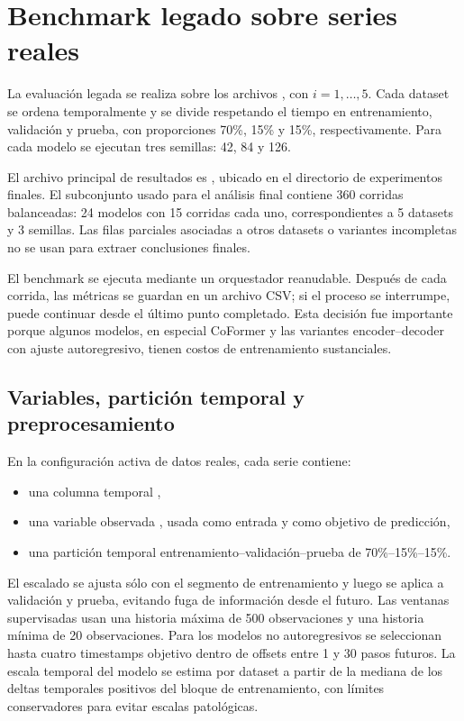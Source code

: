 \section{Benchmark legado sobre series reales}
\label{sec:escenario-real}

La evaluación legada se realiza sobre los archivos , con $i=1,\dots,5$. Cada dataset se ordena temporalmente y se divide respetando el tiempo en entrenamiento, validación y prueba, con proporciones 70\%, 15\% y 15\%, respectivamente. Para cada modelo se ejecutan tres semillas: 42, 84 y 126.

\hfill

El archivo principal de resultados es , ubicado en el directorio de experimentos finales. El subconjunto usado para el análisis final contiene 360 corridas balanceadas: 24 modelos con 15 corridas cada uno, correspondientes a 5 datasets y 3 semillas. Las filas parciales asociadas a otros datasets o variantes incompletas no se usan para extraer conclusiones finales.

\hfill

El benchmark se ejecuta mediante un orquestador reanudable. Después de cada corrida, las métricas se guardan en un archivo CSV; si el proceso se interrumpe, puede continuar desde el último punto completado. Esta decisión fue importante porque algunos modelos, en especial CoFormer y las variantes encoder--decoder con ajuste autoregresivo, tienen costos de entrenamiento sustanciales.

\subsection{Variables, partición temporal y preprocesamiento}
\label{sec:variables-y-preproceso}

En la configuración activa de datos reales, cada serie contiene:
\begin{itemize}
	\item una columna temporal ,
	\item una variable observada , usada como entrada y como objetivo de predicción,
	\item una partición temporal entrenamiento--validación--prueba de 70\%--15\%--15\%.
\end{itemize}

El escalado se ajusta sólo con el segmento de entrenamiento y luego se aplica a validación y prueba, evitando fuga de información desde el futuro. Las ventanas supervisadas usan una historia máxima de 500 observaciones y una historia mínima de 20 observaciones. Para los modelos no autoregresivos se seleccionan hasta cuatro timestamps objetivo dentro de offsets entre 1 y 30 pasos futuros. La escala temporal del modelo se estima por dataset a partir de la mediana de los deltas temporales positivos del bloque de entrenamiento, con límites conservadores para evitar escalas patológicas.

